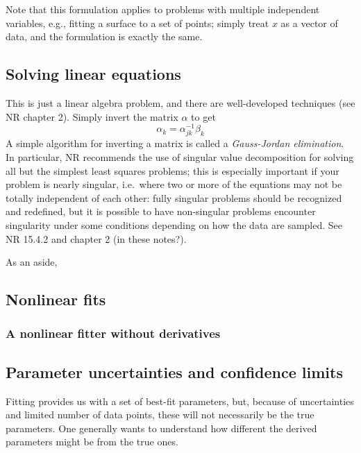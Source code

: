 \documentclass[12pt]{article}
\begin{document}
Note that this formulation applies to problems with multiple
independent variables, e.g., fitting a surface to a set of points;
simply treat $x$ as a vector of data, and the formulation is exactly
the same.

\subsection{Solving linear equations}

This is just a linear algebra problem, and there are well-developed
techniques (see NR chapter 2). Simply invert the matrix $\alpha$
to get
$$ \alpha_k = \alpha_{jk}^{-1}\beta_k $$
A simple algorithm for inverting a matrix is called a
\emph{Gauss-Jordan elimination}. In particular, NR recommends
the use of singular value decomposition for solving all but the
simplest least squares problems; this is especially important if
your problem is nearly singular, i.e.\ where two or more of the
equations may not be totally independent of each other:
fully singular problems should be recognized and redefined,
but it is possible to have non-singular problems encounter
singularity under some conditions depending on how the data are
sampled. See NR 15.4.2 and chapter 2 (in these notes?).

As an aside,

\subsection{Nonlinear fits}
\subsubsection{A nonlinear fitter without derivatives}
\subsection{Parameter uncertainties and confidence limits}
Fitting provides us with a set of best-fit parameters, but, because
of uncertainties and limited number of data points, these will not
necessarily be the true parameters. One generally wants to understand
how different the derived parameters might be from the true ones.
\end{document}
